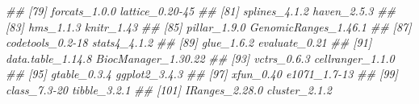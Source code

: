 \documentclass[]{article}
\newcommand{\hlcom}[1]{\textcolor[rgb]{0.502,0.502,0.502}{\textit{#1}}}%
\newenvironment{Shaded}{\begin{myshaded}}{\end{myshaded}}
\newcommand{\DocumentationTok}[1]{\hlcom{#1}}
\begin{document}
\begin{Shaded}
\begin{Highlighting}[]
\DocumentationTok{\#\#  [79] forcats\_1.0.0               lattice\_0.20{-}45            }
\DocumentationTok{\#\#  [81] splines\_4.1.2               haven\_2.5.3                }
\DocumentationTok{\#\#  [83] hms\_1.1.3                   knitr\_1.43                 }
\DocumentationTok{\#\#  [85] pillar\_1.9.0                GenomicRanges\_1.46.1       }
\DocumentationTok{\#\#  [87] codetools\_0.2{-}18            stats4\_4.1.2               }
\DocumentationTok{\#\#  [89] glue\_1.6.2                  evaluate\_0.21              }
\DocumentationTok{\#\#  [91] data.table\_1.14.8           BiocManager\_1.30.22        }
\DocumentationTok{\#\#  [93] vctrs\_0.6.3                 cellranger\_1.1.0           }
\DocumentationTok{\#\#  [95] gtable\_0.3.4                ggplot2\_3.4.3              }
\DocumentationTok{\#\#  [97] xfun\_0.40                   e1071\_1.7{-}13               }
\DocumentationTok{\#\#  [99] class\_7.3{-}20                tibble\_3.2.1               }
\DocumentationTok{\#\# [101] IRanges\_2.28.0              cluster\_2.1.2}
\end{Highlighting}
\end{Shaded}
\end{document}
